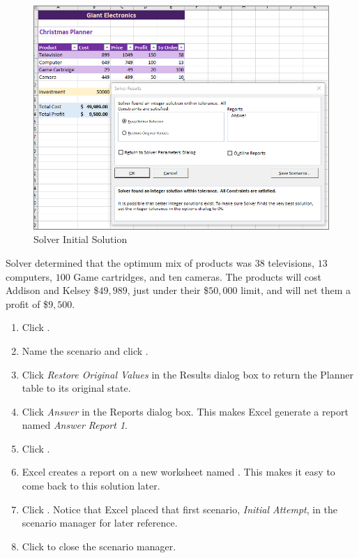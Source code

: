 \begin{figure}[H]
	\centering
	\includegraphics[width=\maxwidth{.95\linewidth}]{gfx/ch08_fig82}
	\caption{Solver Initial Solution}
	\label{08:fig82}
\end{figure}

Solver determined that the optimum mix of products was $ 38 $ televisions, $ 13 $ computers, $ 100 $ Game cartridges, and ten cameras. The products will cost Addison and Kelsey \$$ 49,989 $, just under their \$$ 50,000 $ limit, and will net them a profit of \$$ 9,500 $. 

\begin{enumbox}
	\begin{enumerate}
		\item Click .
		\item Name the scenario  and click .
		\item Click \textit{Restore Original Values} in the Results dialog box to return the Planner table to its original state.
		\item Click \textit{Answer} in the Reports dialog box. This makes Excel generate a report named \textit{Answer Report 1}.
		\item Click .
		\item Excel creates a report on a new worksheet named . This makes it easy to come back to this solution later.
		\item Click .	Notice that Excel placed that first scenario, \textit{Initial Attempt}, in the scenario manager for later reference.
		\item Click  to close the scenario manager.
	\end{enumerate}
\end{enumbox}


